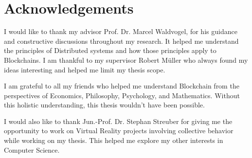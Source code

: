 \chapter*{Acknowledgements}
	I would like to thank my advisor Prof. Dr. Marcel Waldvogel, for his guidance and constructive discussions throughout my research. It helped me understand the principles of Distributed systems and how those principles apply to Blockchains. I am thankful to my supervisor Robert Müller who always found my ideas interesting and helped me limit my thesis scope.
	
	I am grateful to all my friends who helped me understand Blockchain from the perspectives of Economics, Philosophy, Psychology, and Mathematics. Without this holistic understanding, this thesis wouldn't have been possible.
	
	I would also like to thank Jun.-Prof. Dr. Stephan Streuber for giving me the opportunity to work on Virtual Reality projects involving collective behavior while working on my thesis. This helped me explore my other interests in Computer Science.